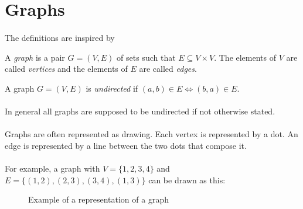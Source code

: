 \section{Graphs}

\paragraph{}
The definitions are inspired by~\cite{diestel2017graph}

\begin{definition}[Graph]
  A \textit{graph} is a pair $G = (V, E)$ of sets such that $E \subseteq V \times V$. The elements of $V$ are called \textit{vertices} and the elements of $E$ are called \textit{edges}.
\end{definition}

\begin{definition}
  A graph $G = (V,E)$ is \textit{undirected} if $(a,b) \in E \Leftrightarrow (b,a) \in E$.
\end{definition}

\paragraph{}
In general all graphs are supposed to be undirected if not otherwise stated.

\paragraph{}
Graphs are often represented as drawing.  Each vertex is represented by a dot. An edge is represented by a line between the two dots that compose it.

\paragraph{}
For example, a graph with $V = \{1,2,3,4\}$ and $E = \{(1,2), (2,3), (3,4), (1,3)\}$ can be drawn as this:

\begin{figure}[H]
  \begin{center}
    \caption{Example of a representation of a graph}
  \end{center}
\end{figure}

